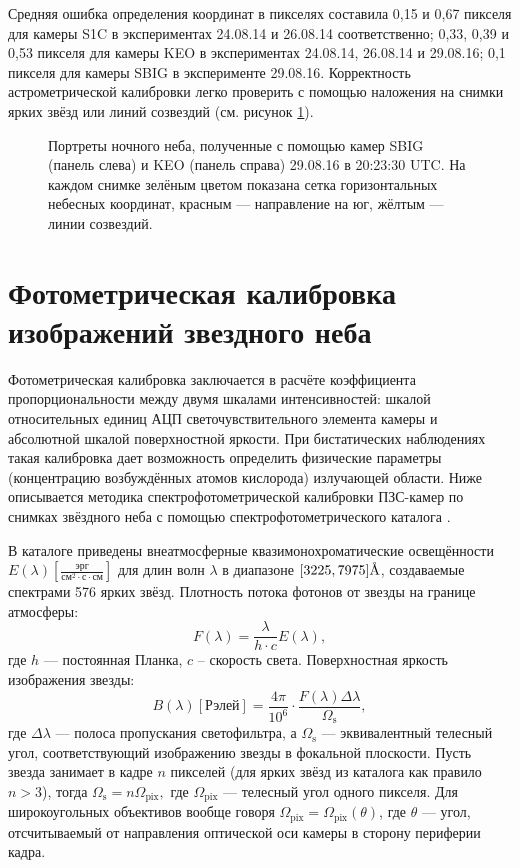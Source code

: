 \documentclass[12pt,a4paper]{article}
\newcommand{\angstrom}{\textup{\AA}}
\begin{document}
Средняя ошибка определения координат в пикселях составила 0,15 и 0,67 пикселя для камеры S1C в экспериментах 24.08.14 и 26.08.14 соответственно; 0,33, 0,39 и 0,53 пикселя для камеры KEO в экспериментах 24.08.14, 26.08.14 и 29.08.16; 0,1 пикселя для камеры SBIG в эксперименте 29.08.16. Корректность астрометрической калибровки легко проверить с помощью наложения на снимки ярких звёзд или линий созвездий (см. рисунок \ref{fig:fig2}).


\begin{figure}[h]
	\caption{Портреты ночного неба, полученные с помощью камер SBIG (панель слева) и KEO (панель справа) 29.08.16 в 20:23:30 UTC. На каждом снимке зелёным цветом показана сетка горизонтальных небесных координат, красным --- направление на юг, жёлтым --- линии созвездий.}
	\label{fig:fig2}
\end{figure}


\section{Фотометрическая калибровка изображений звездного неба} \label{sec:spectro_cal}
Фотометрическая калибровка заключается в расчёте коэффициента пропорциональности между двумя шкалами интенсивностей: шкалой относительных единиц АЦП светочувствительного элемента камеры и абсолютной шкалой поверхностной яркости. При бистатических наблюдениях такая калибровка дает возможность определить физические параметры (концентрацию возбуждённых атомов кислорода) излучающей области. Ниже описывается методика спектрофотометрической калибровки ПЗС-камер по снимках звёздного неба с помощью спектрофотометрического каталога \cite{Kharitonov1978}.

В каталоге \cite{Kharitonov1978} приведены внеатмосферные квазимонохроматические освещённости $E(\lambda) [\frac{\text{эрг}}{\text{см}^2 \cdot \text{с} \cdot \text{см}}]$ для длин волн $\lambda$ в диапазоне $[3225,7975]\angstrom$, создаваемые спектрами 576 ярких звёзд. Плотность потока фотонов от звезды на границе атмосферы:
\begin{equation}\label{eq:eq9}
F(\lambda)=\frac{\lambda}{h \cdot c} E(\lambda),
\end{equation}
где $h$ --- постоянная Планка, $c$ -- скорость света. Поверхностная яркость изображения звезды:
\begin{equation}\label{eq:eq10}
B(\lambda) [\text{Рэлей}] = \frac {4\pi}{10^6} \cdot \frac{F(\lambda) \Delta \lambda} {\Omega_\text{s}},
\end{equation}
где $\Delta \lambda$ --- полоса пропускания светофильтра, а $\Omega_\text{s}$ --- эквивалентный телесный угол, соответствующий изображению звезды в фокальной плоскости. Пусть звезда занимает в кадре $n$ пикселей (для ярких звёзд из каталога \cite{Kharitonov1978} как правило $n>3$), тогда $\Omega_\text{s}=n\Omega_{\text{pix}},$ где $\Omega_{\text{pix}}$ --- телесный угол одного пикселя. Для широкоугольных объективов вообще говоря $\Omega_{\text{pix}}=\Omega_{\text{pix}}(\theta)$, где $\theta$ --- угол, отсчитываемый от направления оптической оси камеры в сторону периферии кадра. 
\end{document}
